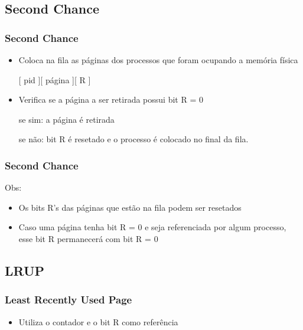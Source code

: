 \documentclass{beamer}
\begin{document}
\subsection{Second Chance} 
\begin{frame}
\frametitle{Second Chance}
\begin{itemize}

\item Coloca na fila as páginas dos processos que foram ocupando a memória física

[ pid ][ página ][ R ]
\newline

\item Verifica se a página a ser retirada possui bit R = 0

se sim: a página é retirada

se não: bit R é resetado e o processo é colocado no final da fila.

\end{itemize}
\justifying
\end{frame}

\begin{frame}
\frametitle{Second Chance}
Obs:
\begin{itemize}

\item Os bits R’s das páginas que estão na fila podem ser resetados

\item Caso uma página tenha bit R = 0 e seja referenciada por algum processo, esse bit R permanecerá com bit R = 0
\end{itemize}
\justifying
\end{frame}


\subsection{LRUP}
\begin{frame}
\frametitle{Least Recently Used Page}
\begin{itemize}
\item Utiliza o contador e o bit R como referência
\end{itemize}
\justifying
\end{frame}

\end{document}
